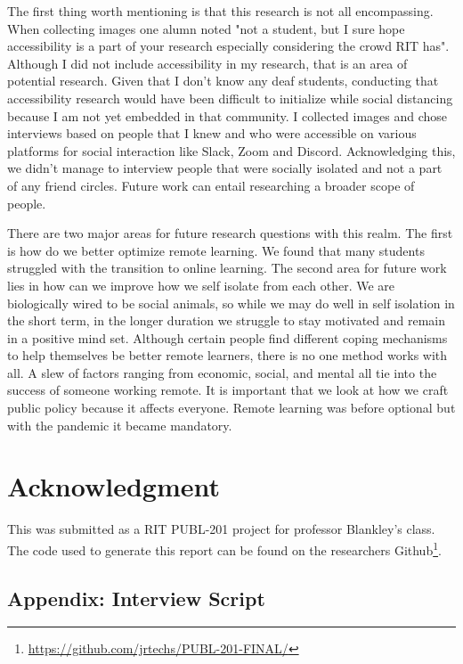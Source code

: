 \documentclass[12pt,
 reprint,
nofootinbib,
 amsmath,amssymb,
 aps,
]{revtex4-2}
\begin{document}
The first thing worth mentioning is that this research is not all encompassing. When collecting images one alumn noted "not a student, but I sure hope accessibility is a part of your research
especially considering the crowd RIT has". Although I did not include accessibility in my research, that is an area of potential research. Given that I don't know any deaf students, conducting that accessibility research would have been difficult to initialize while social distancing because I am not yet embedded in that community.
I collected images and chose interviews based on people that I knew and who were accessible on various platforms for social interaction like Slack, Zoom and Discord. Acknowledging this, we didn't manage to interview people that were socially isolated and not a part of any friend circles. Future work can entail researching a broader scope of people. 

There are two major areas for future research questions with this realm. The first is how do we better optimize remote learning. We found that many students struggled with the transition to online learning. The second area for future work lies in how can we improve how we self isolate from each other. We are biologically wired to be social animals, so while we may do well in self isolation in the short term, in the longer duration we struggle to stay motivated and remain in a positive mind set. Although certain people find different coping mechanisms to help themselves be better remote learners, there is no one method works with all. A slew of factors ranging from economic, social, and mental all tie into the success of someone working remote. It is important that we look at how we craft public policy because it affects everyone. Remote learning was before optional but with the pandemic it became mandatory.

\section{Acknowledgment}

This was submitted as a RIT PUBL-201 project for professor Blankley's class.
The code used to generate this report can be found on the researchers Github\footnote{\url{https://github.com/jrtechs/PUBL-201-FINAL/}}.

\subsection{\label{appendix:interview}Appendix: Interview Script}
\end{document}
